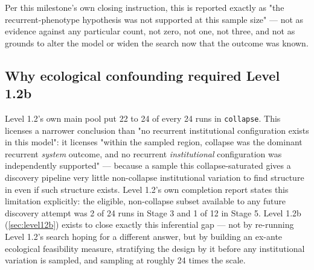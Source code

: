Per this milestone's own closing instruction, this is reported exactly as
"the recurrent-phenotype hypothesis was not supported at this sample
size" --- not as evidence against any particular count, not zero, not
one, not three, and not as grounds to alter the model or widen the search
now that the outcome was known.

\subsection{Why ecological confounding required Level 1.2b}
\label{sec:level12-why-1.2b}

Level 1.2's own main pool put 22 to 24 of every 24 runs in
\texttt{collapse}. This licenses a narrower conclusion than "no recurrent
institutional configuration exists in this model": it licenses "within the
sampled region, collapse was the dominant recurrent \textit{system}
outcome, and no recurrent \textit{institutional} configuration was
independently supported" --- because a sample this collapse-saturated
gives a discovery pipeline very little non-collapse institutional
variation to find structure in even if such structure exists. Level
1.2's own completion report states this limitation explicitly: the
eligible, non-collapse subset available to any future discovery attempt
was 2 of 24 runs in Stage 3 and 1 of 12 in Stage 5. Level 1.2b
(\cref{sec:level12b}) exists to close exactly this inferential gap ---
not by re-running Level 1.2's search hoping for a different answer, but
by building an ex-ante ecological feasibility measure, stratifying the
design by it before any institutional variation is sampled, and sampling
at roughly 24 times the scale.
